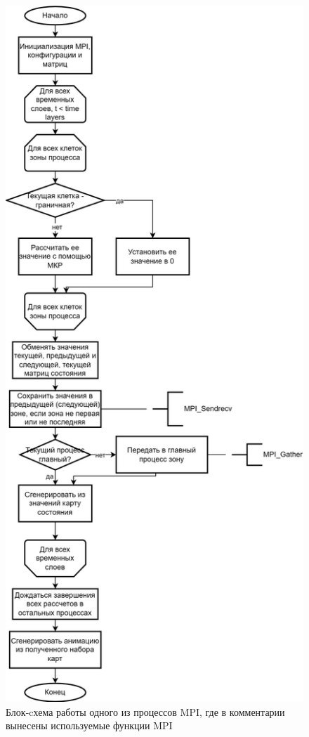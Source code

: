 \begin{figure}[H]
    \centering
    \includegraphics[height=\textheight]{images/lab4_blockscheme.drawio.png}
    \caption{Блок-cхема работы одного из процессов MPI, где в комментарии вынесены используемые функции MPI}
    \label{fig:flowchart}
\end{figure}

